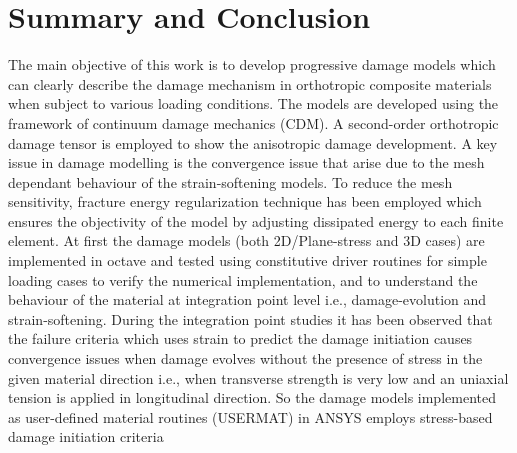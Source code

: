 \documentclass[12pt,openright,twoside]{report}
\begin{document}
\newpage
\chapter{Summary and Conclusion}
\indent\indent\indent The main objective of this work is to develop progressive damage models which can clearly describe the damage mechanism in orthotropic composite materials when subject to various loading conditions. The models are developed using the framework of continuum damage mechanics (CDM). A second-order orthotropic damage tensor is employed to show the anisotropic damage development. A key issue in damage modelling is the convergence issue that arise due to the mesh dependant behaviour of the strain-softening models. To reduce the mesh sensitivity, fracture energy regularization technique has been employed which ensures the objectivity of the model by adjusting dissipated energy to each finite element. At first the damage models (both 2D/Plane-stress and 3D cases) are implemented in octave and tested using constitutive driver routines for simple loading cases to verify the numerical implementation, and to understand the behaviour of the material at integration point level i.e., damage-evolution and strain-softening. During the integration point studies it has been observed that the failure criteria which uses strain to predict the damage initiation causes convergence issues when damage evolves without the presence of stress in the given material direction i.e., when transverse strength is very low and an uniaxial tension is applied in longitudinal direction. So the damage models implemented as user-defined material routines (USERMAT) in ANSYS employs stress-based damage initiation criteria\\ 
\end{document}
